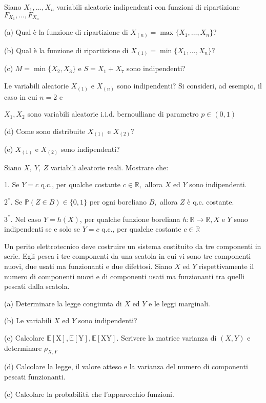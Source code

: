 Siano $X_{1} ,\dotsc ,X_{n}$ variabili aleatorie indipendenti con funzioni di ripartizione $F_{X_{1}} ,\dotsc ,F_{X_{n}}$

(a) Qual è la funzione di ripartizione di $X_{(n)} =\max\{X_{1} ,\dotsc ,X_{n}\} ?$

(b) Qual è la funzione di ripartizione di $X_{(1)} =\min\{X_{1} ,\dotsc ,X_{n}\} ?$

(c) $M=\min\{X_{2} ,X_{3}\}$ e $S=X_{1} +X_{7}$ sono indipendenti?

Le variabili aleatorie $X_{(1)}$ e $X_{(n)}$ sono indipendenti? Si consideri, ad esempio, il caso in cui $n=2$ e

$X_{1} ,X_{2}$ sono variabili aleatorie i.i.d. bernoulliane di parametro $p\in (0,1)$

(d) Come sono distribuite $X_{(1)}$ e $X_{(2)}$?

(e) $X_{(1)}$ e $X_{(2)}$ sono indipendenti?
\Esercizio{}

Siano $X,\ Y,\ Z$ variabili aleatorie reali. Mostrare che:

1. Se $Y=c$ q.c., per qualche costante $c\in \mathbb{R} ,$ allora $X$ ed $Y$ sono indipendenti.

$2^{*} .$ Se $\mathbb{P} (Z\in B)\in \{0,1\}$ per ogni boreliano $B,$ allora $Z$ è q.c. costante.

$3^{*} .$ Nel caso $Y=h(X)$, per qualche funzione boreliana $h:\mathbb{R}\rightarrow \mathbb{R} ,X$ e $Y$ sono indipendenti se e solo se $Y=c$ q.c., per qualche costante $c\in \mathbb{R}$

Un perito elettrotecnico deve costruire un sistema costituito da tre componenti in serie. Egli pesca i tre componenti da una scatola in cui vi sono tre componenti nuovi, due usati ma funzionanti e due difettosi. Siano $X$ ed $Y$ rispettivamente il numero di componenti nuovi e di componenti usati ma funzionanti tra quelli pescati dalla scatola.

(a) Determinare la legge congiunta di $X$ ed $Y$ e le leggi marginali.

(b) Le variabili $X$ ed $Y$ sono indipendenti?

(c) Calcolare $\mathbb{E} [\mathrm{X} ],\mathbb{E} [\mathrm{Y} ],\mathbb{E} [\mathrm{XY} ].$ Scrivere la matrice varianza di $(X,Y)$ e determinare $\rho _{X,Y}$

(d) Calcolare la legge, il valore atteso e la varianza del numero di componenti pescati funzionanti.

(e) Calcolare la probabilità che l'apparecchio funzioni.

